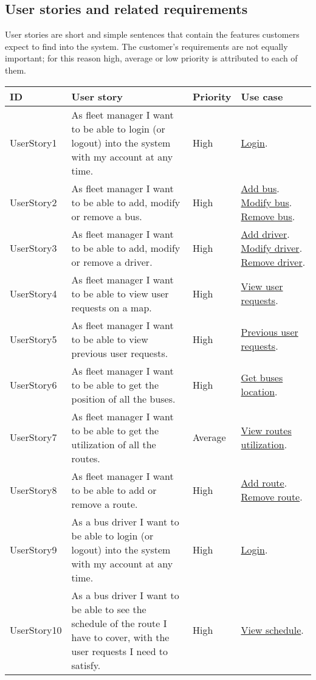 \subsection{User stories and related requirements}
User stories are short and simple sentences that contain the features customers expect to find into the system. The customer's requirements are not equally important; for this reason high, average or low priority is attributed to each of them.
\begin{table}[H]
	\centering
	\begin{tabular}{| m{2.2cm} | m{6cm} | m{1.5cm} | m{2.5cm} |}
		\hline
		\textbf{ID} & \textbf{User story} & \textbf{Priority} & \textbf{Use case}\\
		\hline
		UserStory1 & As fleet manager I want to be able to login (or logout) into the system with my account at any time. & High & \hyperlink{Login_fm}{Login}.\\
		\hline
		UserStory2 & As fleet manager I want to be able to add, modify or remove a bus. & High & \hyperlink{AddBus}{Add bus}. \hyperlink{ModifyBus}{Modify bus}. \hyperlink{RemoveBus}{Remove bus}.\\
		\hline
		UserStory3 & As fleet manager I want to be able to add, modify or remove a driver. & High & \hyperlink{AddDriver}{Add driver}. \hyperlink{ModifyDriver}{Modify driver}. \hyperlink{DeleteDriver}{Remove driver}.\\
		\hline
		UserStory4 & As fleet manager I want to be able to view user requests on a map. & High & \hyperlink{Mapping_user_requests_fm}{View user requests}.\\
		\hline
		UserStory5 & As fleet manager I want to be able to view previous user requests. & High & \hyperlink{PreviousUserRequestsFm}{Previous user requests}.\\
		\hline
		UserStory6 & As fleet manager I want to be able to get the position of all the buses. & High & \hyperlink{Get_bus_location_fm}{Get buses location}.\\
		\hline
		UserStory7 & As fleet manager I want to be able to get the utilization of all the routes. & Average & \hyperlink{View_bus_utilization_fm}{View routes utilization}.\\
		\hline
		UserStory8 & As fleet manager I want to be able to add or remove a route. & High & \hyperlink{AddRoute}{Add route}. \hyperlink{DeleteRoute}{Remove route}.\\
		\hline
		UserStory9 & As a bus driver I want to be able to login (or logout) into the system with my account at any time. & High & \hyperlink{Login_bd}{Login}.\\
		\hline
		UserStory10 & As a bus driver I want to be able to see the schedule of the route I have to cover, with the user requests I need to satisfy. & High & \hyperlink{View_schedule_bd}{View schedule}.\\
		\hline
	\end{tabular}
\end{table}
